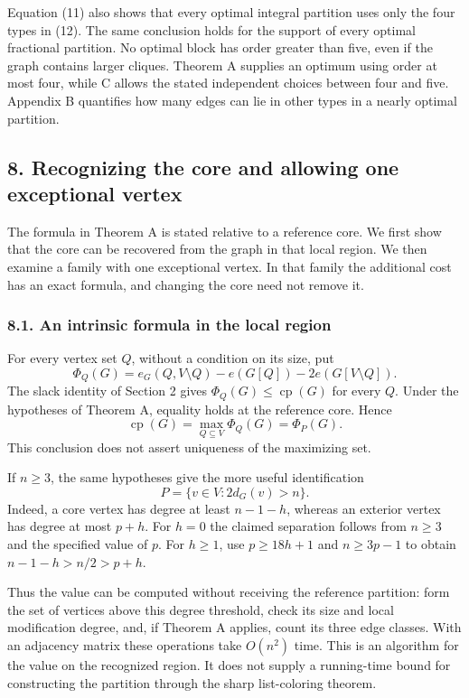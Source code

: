 \documentclass[english,11pt,a4paper]{article}
\begin{document}
Equation (11) also shows that every optimal integral partition uses only
the four types in (12). The same conclusion holds for the support of
every optimal fractional partition. No optimal block has order greater
than five, even if the graph contains larger cliques. Theorem A supplies
an optimum using order at most four, while C allows the stated
independent choices between four and five. Appendix B quantifies how
many edges can lie in other types in a nearly optimal partition.

\subsection{8. Recognizing the core and allowing one exceptional
vertex}\label{recognizing-the-core-and-allowing-one-exceptional-vertex}

The formula in Theorem A is stated relative to a reference core. We
first show that the core can be recovered from the graph in that local
region. We then examine a family with one exceptional vertex. In that
family the additional cost has an exact formula, and changing the core
need not remove it.

\subsubsection{8.1. An intrinsic formula in the local
region}\label{an-intrinsic-formula-in-the-local-region}

For every vertex set \(Q\), without a condition on its size, put \[
\Phi_Q(G)=e_G(Q,V\setminus Q)-e(G[Q])-2e(G[V\setminus Q]).
\] The slack identity of Section 2 gives
\(\Phi_Q(G)\le\operatorname{cp}(G)\) for every \(Q\). Under the
hypotheses of Theorem A, equality holds at the reference core. Hence \[
\operatorname{cp}(G)=\max_{Q\subseteq V}\Phi_Q(G)=\Phi_P(G).
\] This conclusion does not assert uniqueness of the maximizing set.

If \(n\ge3\), the same hypotheses give the more useful identification \[
P=\{v\in V:2d_G(v)>n\}.
\] Indeed, a core vertex has degree at least \(n-1-h\), whereas an
exterior vertex has degree at most \(p+h\). For \(h=0\) the claimed
separation follows from \(n\ge3\) and the specified value of \(p\). For
\(h\ge1\), use \(p\ge18h+1\) and \(n\ge3p-1\) to obtain
\(n-1-h>n/2>p+h\).

Thus the value can be computed without receiving the reference
partition: form the set of vertices above this degree threshold, check
its size and local modification degree, and, if Theorem A applies, count
its three edge classes. With an adjacency matrix these operations take
\(O(n^2)\) time. This is an algorithm for the value on the recognized
region. It does not supply a running-time bound for constructing the
partition through the sharp list-coloring theorem.
\end{document}
